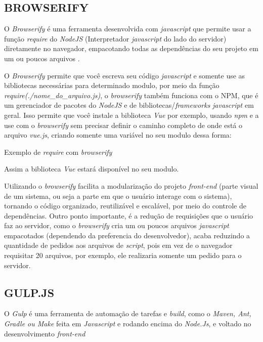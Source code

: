 \subsection{BROWSERIFY}
O \textit{Browserify} é uma ferramenta desenvolvida com \textit{javascript} que permite usar a função \textit{require} do \textit{NodeJS} (Interpretador \textit{javascript} do lado do servidor) diretamente no navegador, empacotando todas as dependências do seu projeto em um ou poucos arquivos \cite{browserify}.

O \textit{Browserify} permite que você escreva seu código \textit{javascript} e somente use as bibliotecas necessárias para determinado modulo, por meio da função \textit{require(./nome\_do\_arquivo.js)}, o \textit{browserify} também funciona com o \ac{NPM}, que é um gerenciador de pacotes do \textit{NodeJS} e de bibliotecas/\textit{frameworks} \textit{javascript} em geral. Isso permite que você instale a biblioteca \textit{Vue} por exemplo, usando \textit{npm} e a use com o \textit{browserify} sem precisar definir o caminho completo de onde está o arquivo \textit{vue.js}, criando somente uma variável no seu modulo dessa forma:
\begin{listing}[H]
    \caption{Exemplo de \textit{require} com \textit{browserify}}
    \label{lst:browserify-vue-example}
\end{listing}
Assim a biblioteca \textit{Vue} estará disponível no seu modulo.

Utilizando o \textit{browserify} facilita a modularização do projeto \textit{front-end} (parte visual de um sistema, ou seja a parte em que o usuário interage com o sistema), tornando o código organizado, reutilizável e escalável, por meio do controle de dependências. Outro ponto importante, é a redução de requisições que o usuário faz ao servidor, como o \textit{browserify} cria um ou poucos arquivos \textit{javascript} empacotados (dependendo da preferencia do desenvolvedor), acaba reduzindo a quantidade de pedidos aos arquivos de \textit{script}, pois em vez de o navegador requisitar 20 arquivos, por exemplo, ele realizaria somente um pedido para o servidor.

\subsection{GULP.JS}

O \textit{Gulp} é uma ferramenta de automação de tarefas e \textit{build}, como o \textit{Maven, Ant, Gradle ou Make} feita em \textit{Javascript} e rodando encima do \textit{Node.Js}, e voltado no desenvolvimento \textit{front-end} \cite{souza-gulp}

